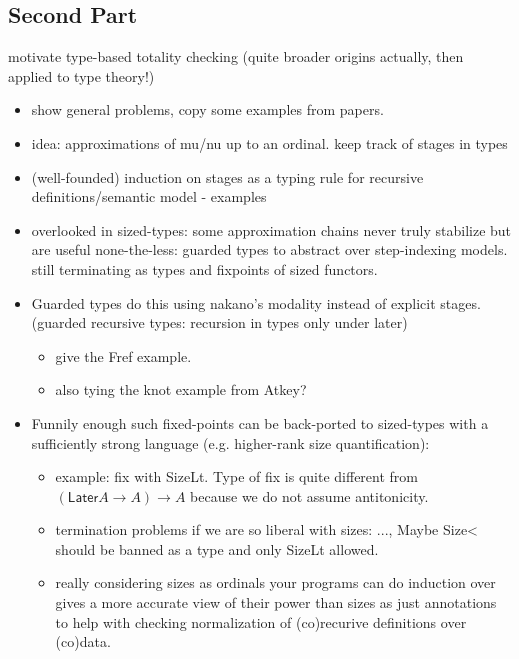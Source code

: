 \documentclass{book}
\begin{document}
\subsection{Second Part}

motivate type-based totality checking (quite broader origins actually, then applied to type theory!)

  \begin{itemize}
  \item show general problems, copy some examples from papers.
  \item idea: approximations of mu/nu up to an ordinal. keep track of stages in types
  \item (well-founded) induction on stages as a typing rule for recursive definitions/semantic model
    - examples
  \item overlooked in sized-types: some approximation chains never truly
  stabilize but are useful none-the-less: guarded types to abstract
  over step-indexing models. still terminating as types and fixpoints of sized functors.
  \item Guarded types do this using nakano's modality instead of explicit stages. (guarded recursive types: recursion in types only under later)
    \begin{itemize}
    \item give the Fref example.
    \item also tying the knot example from Atkey?
    \end{itemize}

  \item Funnily enough such fixed-points can be back-ported to
    sized-types with a sufficiently strong language (e.g. higher-rank
    size quantification):
    \begin{itemize}
    \item example: fix with SizeLt. Type of fix is quite different from
    $(\mathsf{Later} A \to  A) \to A$ because we do not assume antitonicity.

    \item termination problems if we are so liberal with sizes: ..., Maybe Size< should be banned as a type and only SizeLt allowed.
    \item really considering sizes as ordinals your programs can do
         induction over gives a more accurate view of their power than sizes as just
         annotations to help with checking normalization of (co)recurive definitions over (co)data.
    \end{itemize}
    \end{itemize}
\end{document}
